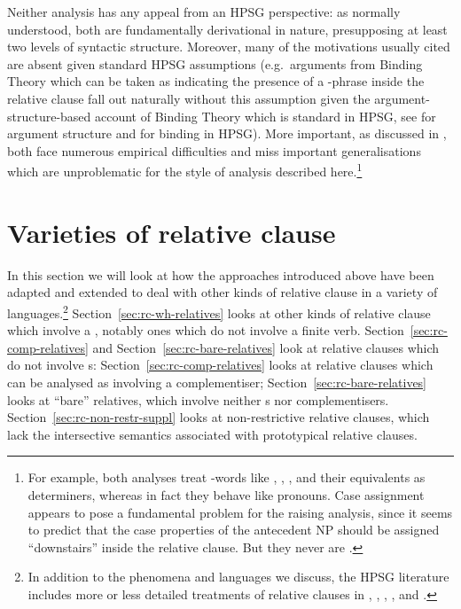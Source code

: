 \documentclass[output=paper,biblatex,babelshorthands,newtxmath,draftmode,colorlinks,citecolor=brown]{langscibook}
\begin{document}
Neither analysis has any appeal from an HPSG perspective: as normally understood, both are
fundamentally derivational in nature, presupposing at least two levels of syntactic
structure. Moreover, many of the motivations usually cited are absent given standard HPSG
assumptions (e.g.\ arguments from Binding Theory which can be taken as indicating the
presence of a -phrase inside the relative clause fall out naturally without this
assumption given the argument-structure-based account of Binding Theory which is standard
in HPSG, see  for argument structure and
   for binding in HPSG). More important, as discussed in
, 
both face numerous empirical difficulties and miss important
generalisations which are unproblematic for the style of analysis described
here.\footnote{For example, both analyses treat -words like
  , , , and their equivalents as determiners, whereas in
  fact they behave like pronouns. Case assignment appears to pose a fundamental problem
  for the raising analysis, since it seems to predict that the case properties of the
  antecedent NP should be assigned ``downstairs'' inside the relative clause. But they
  never are \citep[see][238--239]{Webelhuth18Idioms}.}

\section{Varieties of relative clause}
\label{sec:rc-varieties}
In this section we will look at how the approaches introduced above have been adapted and
extended to deal with other kinds of relative clause in a variety of
languages.\footnote{In addition to the phenomena and languages we discuss, the HPSG
  literature includes more or less detailed treatments of relative clauses in
   \citep{Avgustinova96-Eng,Avgustinova97a-u}, 
  \parencites{Mueller99b}[Chapter~10]{Mueller99a}, 
  \citep{Crysmann:16},  \citep{MMPK2003a-u,Bolc2005a-u}, and 
  \citep{Guengoerdue:96}.  } Section~\ref{sec:rc-wh-relatives} looks at other kinds of
relative clause which involve a , notably ones which do not involve
a finite verb. Section~\ref{sec:rc-comp-relatives} and Section~\ref{sec:rc-bare-relatives}
look at relative clauses which do not involve s:
Section~\ref{sec:rc-comp-relatives} looks at relative clauses which can be analysed as
involving a complementiser; Section~\ref{sec:rc-bare-relatives} looks at ``bare''
relatives, which involve neither s nor
complementisers. Section~\ref{sec:rc-non-restr-suppl} looks at non-restrictive relative
clauses, which lack the intersective semantics associated with prototypical relative
clauses.
\end{document}
